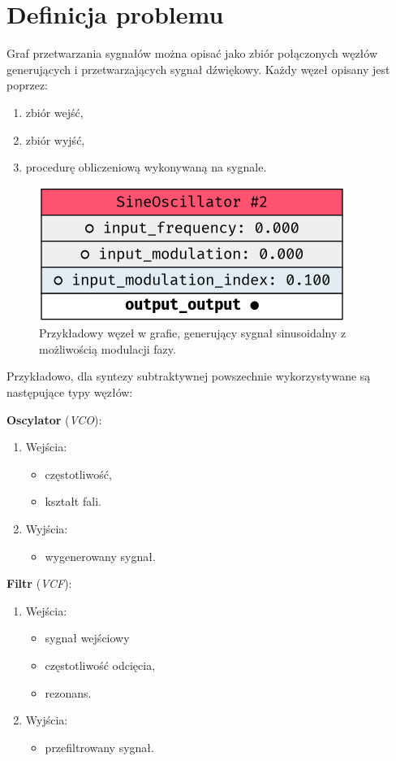 \chapter{Definicja problemu}\label{chap:problem_definition}

Graf przetwarzania sygnałów można opisać jako zbiór połączonych węzłów generujących
i przetwarzających sygnał dźwiękowy. Każdy węzeł opisany jest poprzez:

\begin{enumerate}
  \item zbiór wejść,
  \item zbiór wyjść,
  \item procedurę obliczeniową wykonywaną na sygnale.
\end{enumerate}


\begin{figure}[H]
  \centering
  \includegraphics[width=0.4\linewidth]{rys05/example_sine_node.png}
  \caption{Przykładowy węzeł w grafie, generujący sygnał sinusoidalny z możliwością modulacji fazy.}
\end{figure}


\noindent
Przykładowo, dla syntezy subtraktywnej powszechnie wykorzystywane są następujące typy węzłów:

\begin{multicols}{2}

\noindent
\textbf{Oscylator} (\textit{VCO}):
\begin{enumerate}
  \item Wejścia:
    \begin{itemize}
      \item częstotliwość,
      \item kształt fali.
    \end{itemize}
  \item Wyjścia:
    \begin{itemize}
      \item wygenerowany sygnał.
    \end{itemize}
\end{enumerate}

\noindent
\textbf{Filtr} (\textit{VCF}):
\begin{enumerate}
  \item Wejścia:
    \begin{itemize}
      \item sygnał wejściowy
      \item częstotliwość odcięcia,
      \item rezonans.
    \end{itemize}
  \item Wyjścia:
    \begin{itemize}
      \item przefiltrowany sygnał.
    \end{itemize}
\end{enumerate}

\end{multicols}


